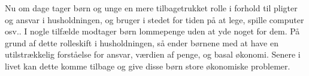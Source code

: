 Nu om dage tager børn og unge en mere tilbagetrukket rolle i forhold til pligter og ansvar i husholdningen, og bruger i stedet for tiden på at lege, spille computer osv.. I nogle tilfælde modtager børn lommepenge uden at yde noget for dem. På grund af dette rolleskift i husholdningen, så ender børnene med at have en utilstrækkelig forståelse for ansvar, værdien af penge, og basal økonomi. Senere i livet kan dette komme tilbage og give disse børn store økonomiske problemer.